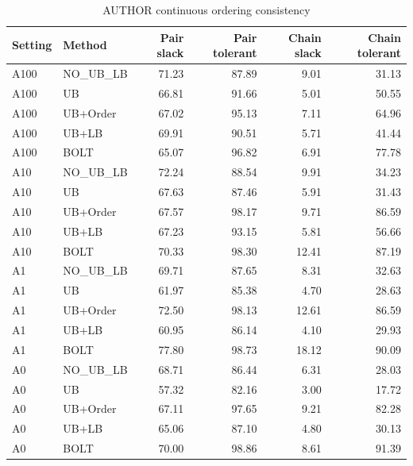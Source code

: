 \begin{table}[H]
\centering
\small
\setlength{\tabcolsep}{5pt}
\caption{AUTHOR continuous ordering consistency}
\label{tab:C_legacy_order_AUTHOR}
\begin{tabular}{@{}llrrrr@{}}
\toprule
Setting & Method & Pair slack & Pair tolerant & Chain slack & Chain tolerant \\
\midrule
A100 & NO\_UB_LB & 71.23 & 87.89 & 9.01 & 31.13 \\
A100 & UB & 66.81 & 91.66 & 5.01 & 50.55 \\
A100 & UB+Order & 67.02 & 95.13 & 7.11 & 64.96 \\
A100 & UB+LB & 69.91 & 90.51 & 5.71 & 41.44 \\
A100 & BOLT & 65.07 & 96.82 & 6.91 & 77.78 \\
A10 & NO\_UB_LB & 72.24 & 88.54 & 9.91 & 34.23 \\
A10 & UB & 67.63 & 87.46 & 5.91 & 31.43 \\
A10 & UB+Order & 67.57 & 98.17 & 9.71 & 86.59 \\
A10 & UB+LB & 67.23 & 93.15 & 5.81 & 56.66 \\
A10 & BOLT & 70.33 & 98.30 & 12.41 & 87.19 \\
A1 & NO\_UB_LB & 69.71 & 87.65 & 8.31 & 32.63 \\
A1 & UB & 61.97 & 85.38 & 4.70 & 28.63 \\
A1 & UB+Order & 72.50 & 98.13 & 12.61 & 86.59 \\
A1 & UB+LB & 60.95 & 86.14 & 4.10 & 29.93 \\
A1 & BOLT & 77.80 & 98.73 & 18.12 & 90.09 \\
A0 & NO\_UB_LB & 68.71 & 86.44 & 6.31 & 28.03 \\
A0 & UB & 57.32 & 82.16 & 3.00 & 17.72 \\
A0 & UB+Order & 67.11 & 97.65 & 9.21 & 82.28 \\
A0 & UB+LB & 65.06 & 87.10 & 4.80 & 30.13 \\
A0 & BOLT & 70.00 & 98.86 & 8.61 & 91.39 \\
\bottomrule
\end{tabular}
\end{table}
